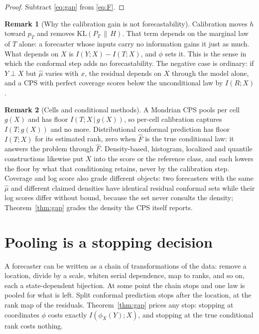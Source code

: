 \documentclass[11pt]{article}
\theoremstyle{definition}
\newtheorem{remark}{Remark}
\newcommand{\KL}{\mathrm{KL}}
\newcommand{\given}{\,\vert\,}
\begin{document}
\begin{proof}
Subtract \eqref{eq:gap} from \eqref{eq:F}.
\end{proof}

\begin{remark}[Why the calibration gain is not forecastability]\label{rem:calgain}
Calibration moves $h$ toward $p_T$ and removes $\KL(P_T\,\|\,H)$. That term depends on the
marginal law of $T$ alone: a forecaster whose inputs carry no information gains it just as
much. What depends on $X$ is $I(Y;X)-I(T;X)$, and $\phi$ sets it. This is the sense in which
the conformal step adds no forecastability. The negative case is ordinary: if $Y\perp X$
but $\hat\mu$ varies with $x$, the residual depends on $X$ through the model alone, and a
CPS with perfect coverage scores below the unconditional law by $I(R;X)$.
\end{remark}

\begin{remark}[Cells and conditional methods]\label{rem:cells}
A Mondrian CPS \citep{bostrom2021mondrian,toccaceli2026crps} pools per cell $g(X)$ and has
floor $I(T;X\given g(X))$, so per-cell calibration captures $I(T;g(X))$ and no more.
Distributional conformal prediction \citep{chernozhukov2021distributional} has floor
$I(T;X)$ for its estimated rank, zero when $\hat F$ is the true conditional law: it answers
the problem through $\hat F$. Density-based, histogram, localized and quantile constructions
\citep{izbicki2020,izbicki2022,sesia2021,guan2023,romano2019conformalized} likewise put $X$
into the score or the reference class, and each lowers the floor by what that conditioning
retains, never by the calibration step. Coverage and log score also grade different objects:
two forecasters with the same $\hat\mu$ and different claimed densities have identical
residual conformal sets while their log scores differ without bound, because the set never
consults the density; Theorem~\ref{thm:gap} grades the density the CPS itself reports.
\end{remark}

\section{Pooling is a stopping decision}\label{sec:stop}

A forecaster can be written as a chain of transformations of the data: remove a location,
divide by a scale, whiten serial dependence, map to ranks, and so on, each a
state-dependent bijection. At some point the chain stops and one law is pooled for what is
left. Split conformal prediction stops after the location, at the rank map of the
residuals. Theorem~\ref{thm:gap} prices any stop: stopping at coordinates $\phi$ costs
exactly $I(\phi_X(Y);X)$, and stopping at the true conditional rank costs nothing.
\end{document}
